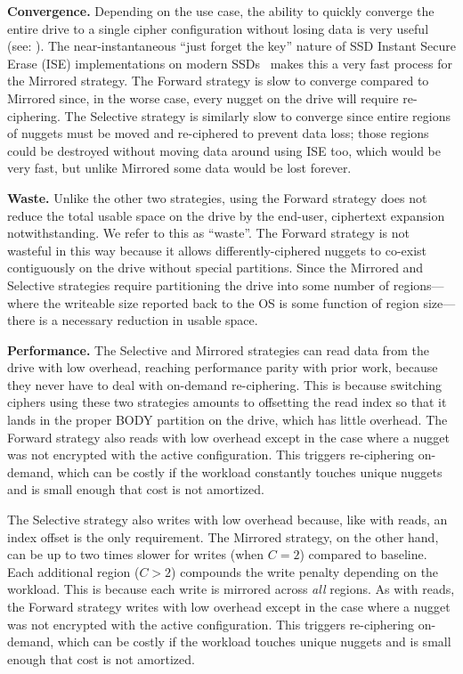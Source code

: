 \textbf{Convergence.} Depending on the use case, the ability to quickly converge
the entire drive to a single cipher configuration without losing data is very
useful (see: ). The near-instantaneous ``just forget the key''
nature of SSD Instant Secure Erase (ISE) implementations on modern
SSDs~\cite{ISE1,ISE2,ISE3} makes this a very fast process for the Mirrored
strategy. The Forward strategy is slow to converge compared to Mirrored since,
in the worse case, every nugget on the drive will require re-ciphering. The
Selective strategy is similarly slow to converge since entire regions of nuggets
must be moved and re-ciphered to prevent data loss; those regions could be
destroyed without moving data around using ISE too, which would be very fast,
but unlike Mirrored some data would be lost forever.

\textbf{Waste.} Unlike the other two strategies, using the Forward strategy does
not reduce the total usable space on the drive by the end-user, ciphertext
expansion notwithstanding. We refer to this as ``waste''. The Forward strategy
is not wasteful in this way because it allows differently-ciphered nuggets to
co-exist contiguously on the drive without special partitions. Since the
Mirrored and Selective strategies require partitioning the drive into some
number of regions---where the writeable size reported back to the OS is some
function of region size---there is a necessary reduction in usable space.

\textbf{Performance.} The Selective and Mirrored strategies can read data from
the drive with low overhead, reaching performance parity with prior work,
because they never have to deal with on-demand re-ciphering. This is because
switching ciphers using these two strategies amounts to offsetting the read
index so that it lands in the proper BODY partition on the drive, which has
little overhead. The Forward strategy also reads with low overhead except in the
case where a nugget was not encrypted with the active configuration. This
triggers re-ciphering on-demand, which can be costly if the workload constantly
touches unique nuggets and is small enough that cost is not amortized.

The Selective strategy also writes with low overhead because, like with reads,
an index offset is the only requirement. The Mirrored strategy, on the other
hand, can be up to two times slower for writes (when $C = 2$) compared to
baseline. Each additional region ($C > 2$) compounds the write penalty depending
on the workload. This is because each write is mirrored across \emph{all}
regions. As with reads, the Forward strategy writes with low overhead except in
the case where a nugget was not encrypted with the active configuration. This
triggers re-ciphering on-demand, which can be costly if the workload touches
unique nuggets and is small enough that cost is not amortized.\\

